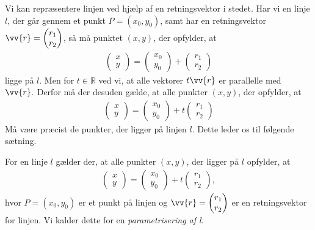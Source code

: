 Vi kan repræsentere linjen ved hjælp af en retningsvektor i stedet. Har vi en linje $l$, der går gennem et punkt $P = (x_0,y_0)$, samt har en retningsvektor $\vv{r} = \begin{pmatrix}
r_1 \\ r_2
\end{pmatrix}$, så må punktet $(x,y)$, der opfylder, at
\begin{align*}
\begin{pmatrix}
x \\ y
\end{pmatrix}
= \begin{pmatrix}
x_0 \\ y_0
\end{pmatrix} + \begin{pmatrix}
r_1 \\ r_2
\end{pmatrix}
\end{align*}
ligge på $l$. Men for $t\in \mathbb{R}$ ved vi, at alle vektorer $t\vv{r}$ er parallelle med $\vv{r}.$ Derfor må der desuden gælde, at alle punkter $(x,y)$, der opfylder, at 
\begin{align*}
\begin{pmatrix}
x \\ y
\end{pmatrix}
=
\begin{pmatrix}
x_0 \\ y_0
\end{pmatrix} 
+
t
\begin{pmatrix}
r_1 \\ r_2
\end{pmatrix}
 \end{align*}
Må være præcist de punkter, der ligger på linjen $l$. Dette leder os til følgende sætning.
\begin{setn}
For en linje $l$ gælder der, at alle punkter $(x,y)$, der ligger på $l$ opfylder, at
\begin{align*}
\begin{pmatrix}
x \\ y
\end{pmatrix}
=
\begin{pmatrix}
x_0 \\ y_0
\end{pmatrix} 
+
t
\begin{pmatrix}
r_1 \\ r_2
\end{pmatrix},
\end{align*} 
hvor $P=(x_0,y_0)$ er et punkt på linjen og $\vv{r} = \begin{pmatrix}
r_1 \\ r_2
\end{pmatrix}$
er en retningsvektor for linjen. Vi kalder dette for en \textit{parametrisering af l}.
\end{setn}

